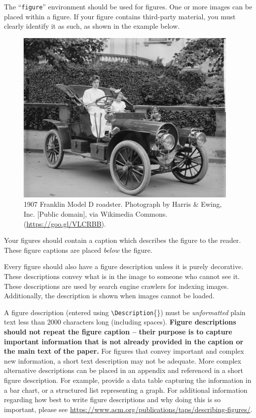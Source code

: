 \documentclass[screen, sigcconf]{timtm}
\begin{document}
The ``\verb|figure|'' environment should be used for figures. One or
more images can be placed within a figure. If your figure contains
third-party material, you must clearly identify it as such, as shown
in the example below.
\begin{figure}[ht]
  \centering
  \includegraphics[width=\linewidth]{sample-franklin}
  \caption{1907 Franklin Model D roadster. Photograph by Harris \&
    Ewing, Inc. [Public domain], via Wikimedia
    Commons. (\url{https://goo.gl/VLCRBB}).}
\end{figure}

Your figures should contain a caption which describes the figure to
the reader. These figure captions are placed {\itshape below} the figure.

Every figure should also have a figure description unless it is purely
decorative. These descriptions convey what is in the image to someone
who cannot see it. These descriptions are used by search engine crawlers for
indexing images. Additionally, the description is shown when images cannot be loaded.

A figure description (entered using \texttt{{\textbackslash}Description}\{\}) must be \emph{unformatted} plain text less than 2000
characters long (including spaces).  {\bfseries Figure descriptions
  should not repeat the figure caption – their purpose is to capture
  important information that is not already provided in the caption or
  the main text of the paper.} For figures that convey important and
complex new information, a short text description may not be
adequate. More complex alternative descriptions can be placed in an
appendix and referenced in a short figure description. For example,
provide a data table capturing the information in a bar chart, or a
structured list representing a graph.  For additional information
regarding how best to write figure descriptions and why doing this is
so important, please see
\url{https://www.acm.org/publications/taps/describing-figures/}.
\end{document}
